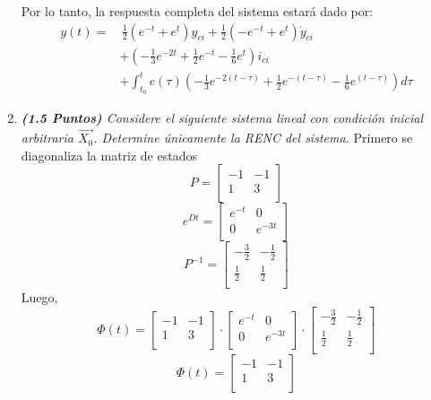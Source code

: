 \begin{enumerate}
Por lo tanto, la respuesta completa del sistema estará dado por:
\begin{align*}
y(t) = & \, \frac{1}{2} (e^{-t} + e^{t}) y_{ci} + \frac{1}{2} (-e^{-t} + e^{t}) \dot{y}_{ci} \\
& + \left( -\frac{1}{3}e^{-2t} + \frac{1}{2}e^{-t} - \frac{1}{6} e^{t} \right) i_{ci} \\
& + \int_{t_0}^{t}
 e(\tau) \left( -\frac{1}{3}e^{-2(t-\tau)} + \frac{1}{2}e^{-(t-\tau)} - \frac{1}{6}e^{(t-\tau)} \right) d\tau
\end{align*}


\item \textit{ \textbf{(1.5 Puntos)} Considere el siguiente sistema lineal con condición inicial arbitraria $\vec{X_0}$. Determine únicamente la RENC del sistema.}
Primero se diagonaliza la matriz de estados
\[
P = 
\begin{bmatrix}
-1 & -1 \\
1 & 3 \\
\end{bmatrix}
\]
\[
e^{Dt} = 
\begin{bmatrix}
e^{-t} & 0 \\
0 & e^{-3t} \\
\end{bmatrix}
\]
\[
P^{-1} = 
\begin{bmatrix}
-\frac{3}{2} & -\frac{1}{2} \\
\frac{1}{2} & \frac{1}{2} \\
\end{bmatrix}
\]
Luego,
\begin{equation}
    \Phi(t)=
    \begin{bmatrix}
-1 & -1 \\
1 & 3 \\
\end{bmatrix}
\cdot
\begin{bmatrix}
e^{-t} & 0 \\
0 & e^{-3t} \\
\end{bmatrix}
\cdot
\begin{bmatrix}
-\frac{3}{2} & -\frac{1}{2} \\
\frac{1}{2} & \frac{1}{2} \\
\end{bmatrix}
\end{equation}
\begin{equation}
    \Phi(t)=
    \begin{bmatrix}
-1 & -1 \\
1 & 3 \\

\end{bmatrix}
\end{equation}
\end{enumerate}
